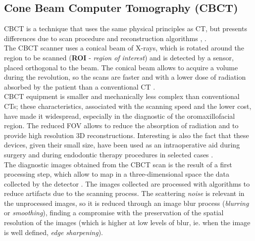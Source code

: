 \subsection{Cone Beam Computer Tomography (CBCT)}
CBCT is a technique that uses the same physical principles as CT, but presents differences due to scan procedure and reconstruction algorithms \parencite{Reference12}, \parencite{Reference13}.\\
The CBCT scanner uses a conical beam of X-rays, which is rotated around the region to be scanned (\textbf{ROI} - \emph{region of interest}) and is detected by a sensor, placed orthogonal to the beam. The conical beam allows to acquire a volume during the revolution, so the scans are faster and with a lower dose of radiation absorbed by the patient than a conventional CT \parencite{Reference14}. \\
CBCT equipment is smaller and mechanically less complex than conventional CTs; these characteristics, associated with the scanning speed and the lower cost, have made it widespread, especially in the diagnostic of the oromaxillofacial region. The reduced FOV allows to reduce the absorption of radiation and to provide high resolution 3D reconstructions. Interesting is also the fact that these devices, given their small size, have been used as an intraoperative aid during surgery \parencite{Reference15} and during endodontic therapy procedures in selected cases \parencite{Reference16}. \\ 
The diagnostic images obtained from the CBCT scan is the result of a first processing step, which allow to map in a three-dimensional space the data collected by the detector \parencite{Reference11}. The images collected are processed with algorithms to reduce artifacts due to the scanning process. The scattering \emph{noise} is relevant in the unprocessed images, so it is reduced through an image blur process (\emph{blurring} or \emph{smoothing}), finding a compromise with the preservation of the spatial resolution of the images (which is higher at low levels of blur, ie. when the image is well defined, \emph{edge sharpening}). \\
